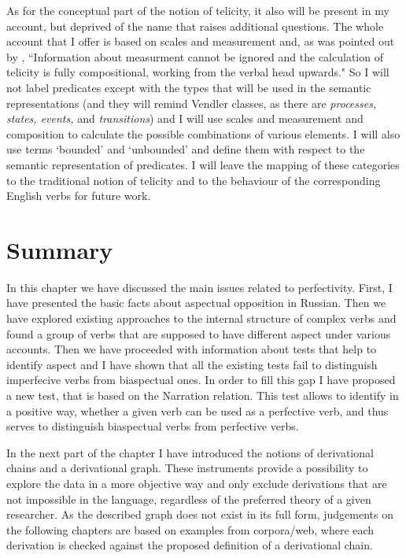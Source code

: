 As for the conceptual part of the notion of telicity, it also will be present in my account, but deprived of the name that raises additional questions. The whole account that I offer is based on scales and measurement and, as was pointed out by \citet[60]{Rothstein:08}, ``Information about measurment cannot be ignored and the calculation of telicity is fully compositional, working from the verbal head upwards." So I will not label predicates except with the types that will be used in the semantic representations (and they will remind Vendler classes, as there are \textit{processes, states, events,} and \textit{transitions}) and I will use scales and measurement and composition to calculate the possible combinations of various elements. I will also use terms `bounded' and `unbounded' and define them with respect to the semantic representation of predicates. I will leave the mapping of these categories to the traditional notion of telicity and to the behaviour of the corresponding English verbs for future work.
 
\section{Summary}
In this chapter we have discussed the main issues related to perfectivity. First, I have presented the basic facts about aspectual opposition in Russian. Then we have explored existing approaches to the internal structure of complex verbs and found a group of verbs that are supposed to have different aspect under various accounts. Then we have proceeded with information about tests that help to identify aspect and I have shown that all the existing tests fail to distinguish imperfecive verbs from biaspectual ones. In order to fill this gap I have proposed a new test, that is based on the Narration relation. This test allows to identify in a positive way, whether a given verb can be used as a perfective verb, and thus serves to distinguish biaspectual verbs from perfective verbs.

In the next part of the chapter I have introduced the notions of derivational chains and a derivational graph. These instruments provide a possibility to explore the data in a more objective way and only exclude derivations that are not impossible in the language, regardless of the preferred theory of a given researcher. As the described graph does not exist in its full form, judgements on the following chapters are based on examples from corpora/web, where each derivation is checked against the proposed definition of a derivational chain.

